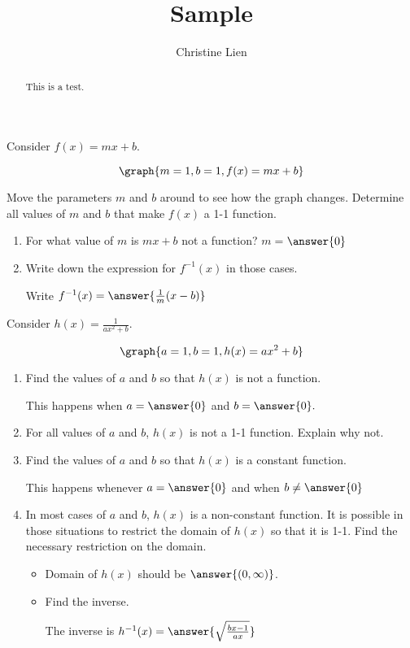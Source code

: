 \documentclass{ximera}
\title{Sample}
\author{Christine Lien}
\begin{document}
\begin{abstract}
This is a test. 
\end{abstract}
\maketitle

Consider $f(x)=mx+b$. 

\[\graph{m=1, b=1, f(x)=mx+b}\]

Move the parameters $m$ and $b$ around to see how the graph changes. 
Determine all values of $m$ and $b$ that make $f(x)$ a 1-1 function. 
\begin{exercise} 
\hfill
\begin{enumerate}
\item For what value of $m$ is $mx+b$ not a function? $m=$$\answer{0}$



\item Write down the expression for $f^{-1}(x)$ in those cases. 

Write $f^{-1}(x)= \answer{\frac{1}{m}(x-b)}$

\end{enumerate}

\end{exercise}

\begin{exercise}
Consider $h(x)=\frac{1}{ax^2+b}$. 

\[\graph{a=1, b=1, h(x)=ax^2+b}\]

\begin{enumerate}
\item Find the values of $a$ and $b$ so that $h(x)$ is not a function. 

This happens when $a=\answer{0} $\textrm{ and }$b=\answer{0}.$

\item For all values of $a$ and $b$, $h(x)$ is not a 1-1 function. Explain why not.


\item Find the values of $a$ and $b$ so that $h(x)$ is a constant function. 

This happens whenever $a=\answer{0}$  and when $b\neq\answer{0}$

\item In most cases of $a$ and $b$, $h(x)$ is a non-constant function. It is possible in those situations to restrict the domain of $h(x)$ so that it is 1-1. Find the necessary restriction on the domain. 

\begin{itemize}
\item Domain of $h(x)$ should be $\answer{(0, \infty)}$.

\item Find the inverse. 

The inverse is $h^{-1}(x) = \answer{\sqrt{\frac{bx-1}{ax}}}$

\end{itemize}
\end{enumerate} 

\end{exercise}
\end{document}
